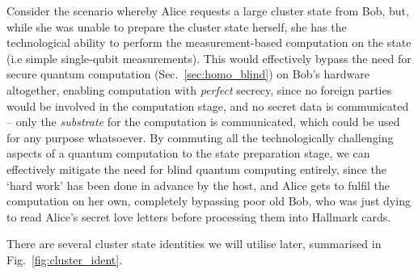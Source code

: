 Consider the scenario whereby Alice requests a large cluster state from Bob, but, while she was unable to prepare the cluster state herself, she has the technological ability to perform the measurement-based computation on the state (i.e simple single-qubit measurements). This would effectively bypass the need for secure quantum computation (Sec.~\ref{sec:homo_blind}) on Bob's hardware altogether, enabling computation with \textit{perfect} secrecy, since no foreign parties would be involved in the computation stage, and no secret data is communicated -- only the \textit{substrate} for the computation is communicated, which could be used for any purpose whatsoever. By commuting all the technologically challenging aspects of a quantum computation to the state preparation stage, we can effectively mitigate the need for blind quantum computing entirely, since the `hard work' has been done in advance by the host, and Alice gets to fulfil the computation on her own, completely bypassing poor old Bob, who was just dying to read Alice's secret love letters before processing them into Hallmark cards.

There are several cluster state identities we will utilise later, summarised in Fig.~\ref{fig:cluster_ident}.

